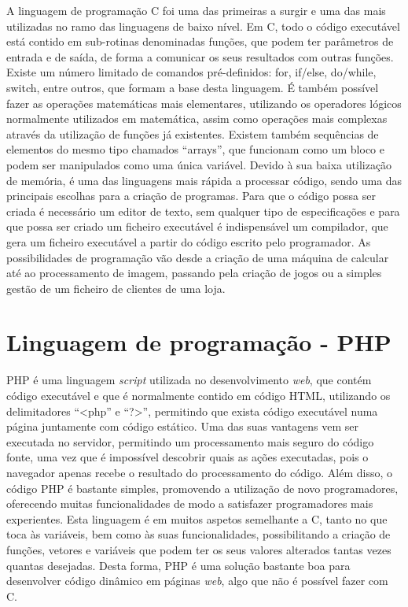 A linguagem de programação C foi uma das primeiras a surgir e uma das mais utilizadas no ramo das linguagens de baixo nível.
Em C, todo o código executável está contido em sub-rotinas denominadas funções, que podem ter parâmetros de entrada e de saída, de forma a comunicar os seus resultados com outras funções.
Existe um número limitado de comandos pré-definidos: for, if/else, do/while, switch, entre outros, que formam a base desta linguagem.
É também possível fazer as operações matemáticas mais elementares, utilizando os operadores lógicos normalmente utilizados em matemática, assim como operações mais complexas através da utilização de funções já existentes.
Existem também sequências de elementos do mesmo tipo chamados ``arrays'', que funcionam como um bloco e podem ser manipulados como uma única variável.
Devido à sua baixa utilização de memória, é uma das linguagens mais rápida a processar código, sendo uma das principais escolhas para a criação de programas.
Para que o código possa ser criada é necessário um editor de texto, sem qualquer tipo de especificações e para que possa ser criado um ficheiro executável é indispensável um compilador, que gera um ficheiro executável a partir do código escrito pelo programador.
As possibilidades de programação vão desde a criação de uma máquina de calcular até ao processamento de imagem, passando pela criação de jogos ou a simples gestão de um ficheiro de clientes de uma loja.

\section{Linguagem de programação - PHP}
\label{sec:php}

PHP é uma linguagem \emph{script} utilizada no desenvolvimento \emph{web}, que contém código executável e que é normalmente contido em código HTML, utilizando os delimitadores ``<php'' e ``?>'', permitindo que exista código executável numa página juntamente com código estático.
Uma das suas vantagens vem ser executada no servidor, permitindo um processamento mais seguro do código fonte, uma vez que é impossível descobrir quais as ações executadas, pois o navegador apenas recebe o resultado do processamento do código.
Além disso, o código PHP é bastante simples, promovendo a utilização de novo programadores, oferecendo muitas funcionalidades de modo a satisfazer programadores mais experientes.
Esta linguagem é em muitos aspetos semelhante a C, tanto no que toca às variáveis, bem como às suas funcionalidades, possibilitando a criação de funções, vetores e variáveis que podem ter os seus valores alterados tantas vezes quantas desejadas.
Desta forma, PHP é uma solução bastante boa para desenvolver código dinâmico em páginas \emph{web}, algo que não é possível fazer com C.

